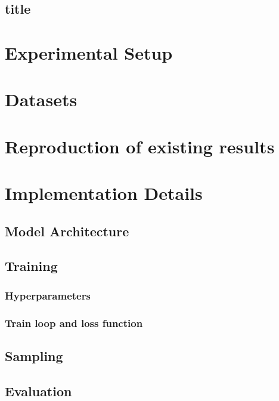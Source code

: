 

\subsection[short]{title}

\section{Experimental Setup}
\label{ch:methods-experimentalSetup}
\section{Datasets}
\label{ch:methods-datasets}
\section{Reproduction of existing results}

\section{Implementation Details}
\label{ch:methods-implementationDetails}

\subsection{Model Architecture}
\label{ch:methods-implementationDetails-modelArchitecture}

\subsection{Training}
\label{ch:methods-implementationDetails-training}

\subsubsection{Hyperparameters}
\label{ch:methods-implementationDetails-training-hyperparameters}

\subsubsection{Train loop and loss function}
\label{ch:methods-implementationDetails-training-trainLoopAndLossFunction}

\subsection{Sampling}
\label{ch:methods-implementationDetails-sampling}

\subsection{Evaluation}
\label{ch:methods-implementationDetails-evaluation}
